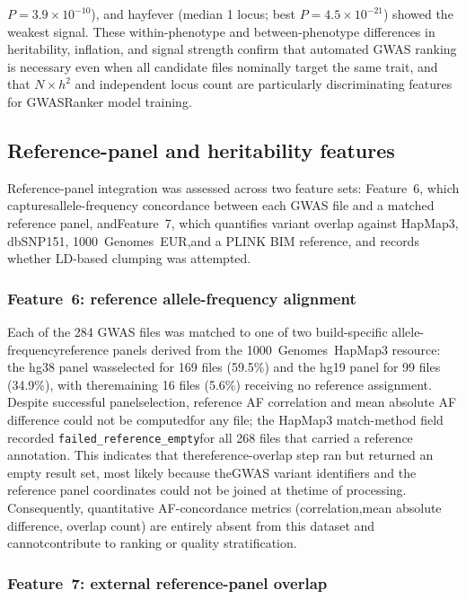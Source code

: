 \documentclass[11pt,a4paper]{article}
\begin{document}
$P = 3.9 \times 10^{-10}$), and hayfever (median 1 locus; best $P = 4.5 \times 10^{-21}$) showed the weakest signal. These within-phenotype and between-phenotype differences in heritability, inflation, and signal strength confirm that automated GWAS ranking is necessary even when all candidate files nominally target the same trait, and that $N \times h^2$ and independent locus count are particularly discriminating features for GWASRanker model training.

\subsection{Reference-panel and heritability features}

Reference-panel integration was assessed across two feature sets: Feature~6, which capturesallele-frequency concordance between each GWAS file and a matched reference panel, andFeature~7, which quantifies variant overlap against HapMap3, dbSNP151, 1000~Genomes~EUR,and a PLINK BIM reference, and records whether LD-based clumping was attempted.

\subsubsection*{Feature~6: reference allele-frequency alignment}

Each of the 284 GWAS files was matched to one of two build-specific allele-frequencyreference panels derived from the 1000~Genomes~HapMap3 resource: the hg38 panel wasselected for 169 files (59.5\%) and the hg19 panel for 99 files (34.9\%), with theremaining 16 files (5.6\%) receiving no reference assignment. Despite successful panelselection, reference AF correlation and mean absolute AF difference could not be computedfor any file; the HapMap3 match-method field recorded \texttt{failed\_reference\_empty}for all 268 files that carried a reference annotation. This indicates that thereference-overlap step ran but returned an empty result set, most likely because theGWAS variant identifiers and the reference panel coordinates could not be joined at thetime of processing. Consequently, quantitative AF-concordance metrics (correlation,mean absolute difference, overlap count) are entirely absent from this dataset and cannotcontribute to ranking or quality stratification.

\subsubsection*{Feature~7: external reference-panel overlap}
\end{document}

